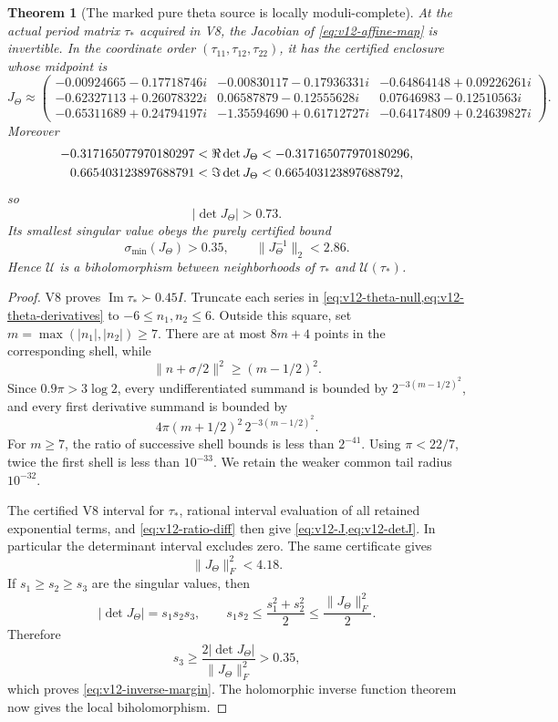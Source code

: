 \documentclass[11pt]{article}
\newtheorem{theorem}{Theorem}[section]
\theoremstyle{definition}
\theoremstyle{remark}
\begin{document}
\begin{theorem}[The marked pure theta source is locally moduli-complete]
\label{thm:v12-local-inverse}
At the actual period matrix \(\tau_*\) acquired in V8, the Jacobian of
\cref{eq:v12-affine-map} is invertible.  In the coordinate order
\((\tau_{11},\tau_{12},\tau_{22})\), it has the certified enclosure whose
midpoint is
\begin{equation}
 J_\Theta\approx
 \begin{pmatrix}
 -0.00924665-0.17718746i&
 -0.00830117-0.17936331i&
 -0.64864148+0.09226261i\\
 -0.62327113+0.26078322i&
  0.06587879-0.12555628i&
  0.07646983-0.12510563i\\
 -0.65311689+0.24794197i&
 -1.35594690+0.61712727i&
 -0.64174809+0.24639827i
 \end{pmatrix}.
 \label{eq:v12-J}
\end{equation}
Moreover
\begin{align}
 -0.317165077970180297
 &<\Re\det J_\Theta
 <-0.317165077970180296,\notag\\
 0.665403123897688791
 &<\Im\det J_\Theta
 <0.665403123897688792,
 \label{eq:v12-detJ}
\end{align}
so
\begin{equation}
 \boxed{|\det J_\Theta|>0.73.}
 \label{eq:v12-det-margin}
\end{equation}
Its smallest singular value obeys the purely certified bound
\begin{equation}
 \boxed{\sigma_{\min}(J_\Theta)>0.35,
 \qquad \|J_\Theta^{-1}\|_2<2.86.}
 \label{eq:v12-inverse-margin}
\end{equation}
Hence \(\mathcal U\) is a biholomorphism between neighborhoods of
\(\tau_*\) and \(\mathcal U(\tau_*)\).
\end{theorem}
\begin{proof}
V8 proves
\(\operatorname{Im}\tau_*\succ0.45I\).  Truncate each series in
\cref{eq:v12-theta-null,eq:v12-theta-derivatives} to
\(-6\le n_1,n_2\le6\).  Outside this square, set
\(m=\max(|n_1|,|n_2|)\ge7\).  There are at most \(8m+4\) points in the
corresponding shell, while
\[
 \|n+\sigma/2\|^2\ge(m-1/2)^2.
\]
Since \(0.9\pi>3\log2\), every undifferentiated summand is bounded by
\(2^{-3(m-1/2)^2}\), and every first derivative summand is bounded by
\[
 4\pi(m+1/2)^2\,2^{-3(m-1/2)^2}.
\]
For \(m\ge7\), the ratio of successive shell bounds is less than
\(2^{-41}\).  Using \(\pi<22/7\), twice the first shell is less than
\(10^{-33}\).  We retain the weaker common tail radius \(10^{-32}\).

The certified V8 interval for \(\tau_*\), rational interval evaluation of
all retained exponential terms, and \cref{eq:v12-ratio-diff} then give
\cref{eq:v12-J,eq:v12-detJ}.  In particular the determinant interval excludes
zero.  The same certificate gives
\[
 \|J_\Theta\|_F^2<4.18.
\]
If \(s_1\ge s_2\ge s_3\) are the singular values, then
\[
 |\det J_\Theta|=s_1s_2s_3,
 \qquad
 s_1s_2\le\frac{s_1^2+s_2^2}{2}
 \le\frac{\|J_\Theta\|_F^2}{2}.
\]
Therefore
\[
 s_3\ge\frac{2|\det J_\Theta|}{\|J_\Theta\|_F^2}>0.35,
\]
which proves \cref{eq:v12-inverse-margin}.  The holomorphic inverse function
theorem now gives the local biholomorphism.
\end{proof}
\end{document}
